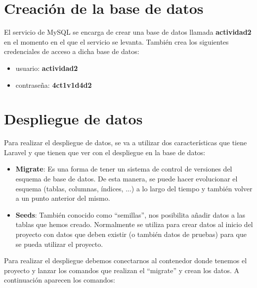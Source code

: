 \documentclass{\ClassPath/viu-tfm-template}
\begin{document}
\section{Creación de la base de datos}

El servicio de MySQL se encarga de crear una base de datos llamada \textbf{actividad2} en el momento en el que el servicio se levanta. También crea los siguientes credenciales de acceso a dicha base de datos:

\vspace{-1em}
\begin{itemize}
    \item usuario:  \textbf{actividad2}
    \item contraseña:  \textbf{4ct1v1d4d2}
\end{itemize}
\vspace{-1em}

\section{Despliegue de datos}
Para realizar el despliegue de datos, se va a utilizar dos características que tiene Laravel y que tienen que ver con el despliegue en la base de datos:

\vspace{-1em}
\begin{itemize}
    \item \textbf{Migrate}: Es una forma de tener un sistema de control de versiones del esquema de base de datos. De esta manera, se puede hacer evolucionar el esquema (tablas, columnas, índices, ...) a lo largo del tiempo y también volver a un punto anterior del mismo.
    \item \textbf{Seeds}: También conocido como “semillas”, nos posibilita añadir datos a las tablas que hemos creado. Normalmente se utiliza para crear datos al inicio del proyecto con datos que deben existir (o también datos de pruebas) para que se pueda utilizar el proyecto.
\end{itemize}
\vspace{-1em}

Para realizar el despliegue debemos conectarnos al contenedor donde tenemos el proyecto y lanzar los comandos que realizan el “migrate” y crean los datos. A continuación aparecen los comandos:

\end{document}
